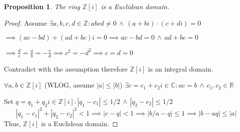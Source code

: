 \documentclass{article}
\newtheorem*{prop}{Proposition}
\theoremstyle{definition}\newtheorem{definition}{Definition}
\begin{document}
	\begin{prop}
		The ring $\mathbb Z[i]$ is a Euclidean domain.
	\end{prop}
			
	\begin{proof}
		Assume $\exists a,b,c,d \in \mathbb Z : abcd \neq 0\, \land \, (a+bi)\cdot (c+di)=0 $
		
		$\implies (ac-bd)+(ad+bc)i=0 \implies ac-bd=0 \, \land \, ad+bc=0 $
		
		$\implies \frac dc = \frac ab = -\frac cd \implies c^2=-d^2 \implies c=d=0 $
		
		Contradict with the assumption therefore $\mathbb Z[i]$ is an integral domain. 
		
		$\forall a,b \in \mathbb Z[i]$ (WLOG, assume $|a| \leq |b|$) $\exists c=c_1+c_2i \in  \mathbb C : ac=b \, \land \, c_1,c_2 \in \mathbb R$ 
		
		Set $q=q_1+q_2i \in \mathbb Z[i]: |q_1-c_1|\leq 1/2 \, \land \, |q_2-c_2|\leq 1/2$ 
		$$
		|q_1-c_1|^2+|q_2-c_2|^2< 1 \implies |c-q|<1 \implies |{b}/{a}-q| \leq 1 \implies |b-aq|\leq |a|
		$$ 
		Thus, $\mathbb Z[i]$ is a Euclidean domain.
	\end{proof}
\end{document}
